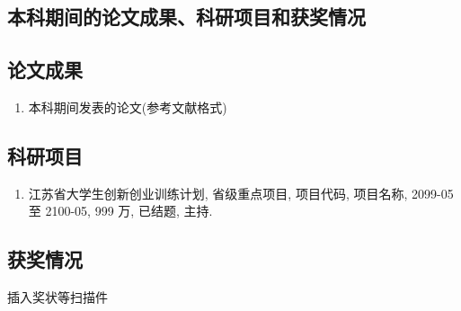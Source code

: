 
\begin{spacing}{0.8}
\chapter{本科期间的论文成果、科研项目和获奖情况}
\section{论文成果}
\begin{enumerate}
  \item
  本科期间发表的论文(参考文献格式)
\end{enumerate}


\section{科研项目}
\begin{enumerate}
  \item 江苏省大学生创新创业训练计划, 省级重点项目, 项目代码, 项目名称, 2099-05 至 2100-05, 999 万, 已结题, 主持.
\end{enumerate}

\section{获奖情况}
插入奖状等扫描件
\end{spacing}
